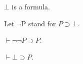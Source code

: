 \documentclass{stex}
\newcommand{\imp}{\supset}
\newcommand{\deducible}{\vdash}
\newcommand{\falsum}{\bot}
\newcommand{\negate}{\lnot}
\begin{document}
\begin{forthel}
\begin{signature}[Falsum]
    $\falsum$ is a formula.
\end{signature}

Let $\negate$P stand for $P\imp\falsum$.

\begin{axiom}
    $\deducible\negate\negate P\imp P$.
\end{axiom}

\begin{proposition}[Explosion]
    $\deducible \falsum\imp P$.
\end{proposition}

\end{forthel}
\end{document}
